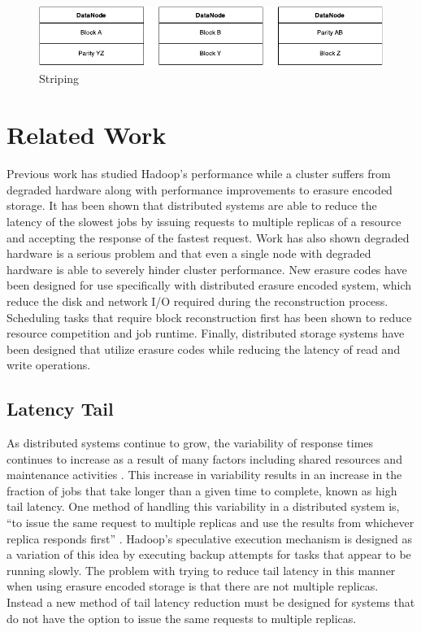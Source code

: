 \documentclass{ucetd}
\begin{document}
\begin{figure}[h]
    \centering
    \includegraphics[width=\textwidth]{diagrams/Striping.pdf}
    \caption{Striping}
    \label{striping}
\end{figure}


\chapter{Related Work}

Previous work has studied Hadoop's performance while a cluster suffers from
degraded hardware along with performance improvements to erasure encoded
storage. It has been shown that distributed systems are able to reduce the
latency of the slowest jobs by issuing requests to multiple replicas of a
resource and accepting the response of the fastest request. Work has also shown
degraded hardware is a serious problem and that even a single node with degraded
hardware is able to severely hinder cluster performance. New erasure codes have
been designed for use specifically with distributed erasure encoded system,
which reduce the disk and network I/O required during the reconstruction
process. Scheduling tasks that require block reconstruction first has been shown
to reduce resource competition and job runtime. Finally, distributed storage
systems have been designed that utilize erasure codes while reducing the latency
of read and write operations.

\section{Latency Tail}

As distributed systems continue to grow, the variability of response times
continues to increase as a result of many factors including shared resources and
maintenance activities \cite{Dean:Tail}. This increase in variability results in an
increase in the fraction of jobs that take longer than a given time to complete,
known as high tail latency. One method of handling this variability in a
distributed system is, ``to issue the same request to multiple replicas and use
the results from whichever replica responds first'' \cite{Dean:Tail}. Hadoop's
speculative execution mechanism is designed as a variation of this idea by
executing backup attempts for tasks that appear to be running slowly. The
problem with trying to reduce tail latency in this manner when using erasure
encoded storage is that there are not multiple replicas. Instead a new method of
tail latency reduction must be designed for systems that do not have the
option to issue the same requests to multiple replicas.
\end{document}
